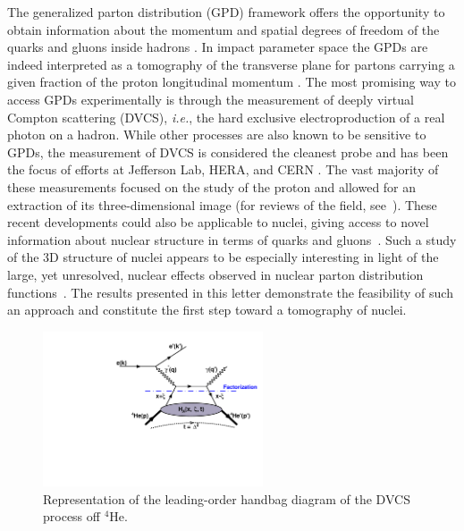 \documentclass[twocolumn,nofootinbib,showpacs,prl,superscriptaddress,secnumarabic,amssymb,nobibnotes,aps,floatfix]{revtex4}
\begin{document}
The generalized parton distribution (GPD) framework offers the opportunity to 
obtain information about the momentum and spatial degrees of freedom of the 
quarks and gluons inside hadrons \cite{Mueller:1998fv,Ji:1996ek,Ji:1996nm,
Radyushkin:1996nd,Radyushkin:1997ki}. In impact parameter space the GPDs are 
indeed interpreted as a tomography of the transverse plane for partons 
carrying a given fraction of the proton longitudinal momentum 
\cite{Burkardt:2000za,Diehl:2002he,Belitsky:2002ep,Burkardt:2005hp}. The most 
promising way to access GPDs experimentally is through the measurement of 
deeply virtual Compton scattering (DVCS), \textit{i.e.}, the hard exclusive 
electroproduction of a real photon on a hadron. While other processes are also known 
to be sensitive to GPDs, the measurement of DVCS is considered the cleanest 
probe and has been the focus of efforts at Jefferson Lab, HERA, and CERN 
\cite{Stepanyan:2001sm,Airapetian,Airapetian:2010nu,Chekanov:2003ya,Adloff:2001cn,Aktas:2005ty,Chen:2006na,
MunozCamacho:2006hx,Girod:2007aa,Mazouz:2007aa,Gavalian:2009,Seder:2015,Defurne:2015kxq,
Pisano:2015,Jo:2015ema,Joerg:2016hhs}. The vast majority of these measurements 
focused on the study of the proton and allowed for an extraction of its 
three-dimensional image (for reviews of the field, see~\cite{Goeke:2001tz,
Diehl:2003ny,Ji:2004gf,Belitsky:2005qn,Boffi:2007yc,Guidal:2013rya}). These 
recent developments could also be applicable to nuclei, giving access to novel 
information about nuclear structure in terms of quarks and gluons~\cite{Berger:2001zb,
Cano:2003ju,Guzey:2005ba,Dupre:2015jha}. Such a study of the 3D 
structure of nuclei appears to be especially interesting in light of the large, 
yet unresolved, nuclear effects observed in nuclear parton distribution 
functions~\cite{Geesaman:1995yd,Norton:2003cb,Hen:2016kwk}. The results 
presented in this letter demonstrate the feasibility of such an approach and 
constitute the first step toward a tomography of nuclei.

\begin{figure}[tb]
\includegraphics[width=6.5cm]{DVCS_diagram.pdf}
\caption{Representation of the leading-order handbag diagram of the DVCS 
process off $^4$He.}
\label{fig:diags}
\end{figure}
\end{document}
